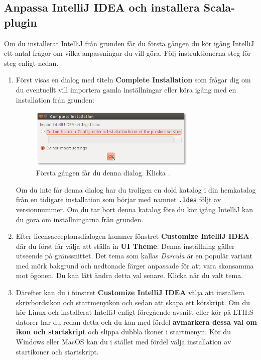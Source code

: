 \subsection{Anpassa IntelliJ IDEA och installera Scala-plugin}\label{appendix:ide:intellij:tweak}
Om du installerat IntelliJ från grunden får du första gången du kör igång IntelliJ ett antal frågor om vilka anpassningar du vill göra. Följ instruktionerna steg för steg enligt nedan.
\begin{enumerate}

\item Först visas en dialog med titeln \textbf{Complete Installation} som frågar dig om du eventuellt vill importera gamla inställningar eller köra igång med en installation från grunden:
\begin{figure}%
\centering
\includegraphics[width=0.75\textwidth]{../img/intellij/idea1-complete-installation.png}
\caption {Första gången får du denna dialog. Klicka .}
\label{fig:idea:import-projects}
\end{figure}
Om du inte får denna dialog har du troligen en dold katalog i din hemkatalog från en tidigare installation som börjar med namnet \texttt{.Idea} följt av versionnummer. Om du tar bort denna katalog före du kör igång IntelliJ kan du göra om inställningarna från grunden.

\item Efter licensacceptansdialogen kommer fönstret \textbf{Customize IntelliJ IDEA} där du först får välja att ställa in \textbf{UI Theme}. Denna inställning gäller utseende på gränssnittet. Det tema som kallas \textit{Darcula} är en populär variant med mörk bakgrund och nedtonade färger anpassade för att vara skonsamma mot ögonen. Du kan lätt ändra detta val senare. Klicka  när du valt tema.

\item Därefter kan du i fönstret \textbf{Customize IntelliJ IDEA} välja att installera skrivbordsikon och startmenyikon och sedan att skapa ett körskript. Om du kör Linux och installerat IntelliJ enligt föregående avsnitt eller kör på LTH:S datorer har du redan detta och du kan med fördel \textbf{avmarkera dessa val om ikon och startskript} och slippa dubbla ikoner i startmenyn. Kör du Windows eller MacOS kan du i stället med fördel välja installation av startikoner och startskript.


\end{enumerate}
